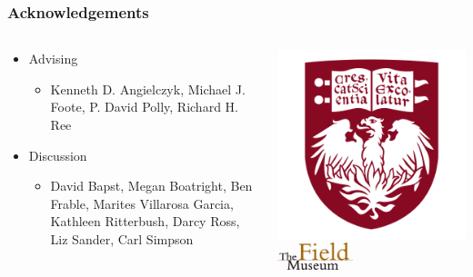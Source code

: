 \documentclass{beamer}
\begin{document}
\begin{frame}
  \frametitle{Acknowledgements}
  \begin{columns}
    \begin{column}{0.4\textwidth}
      \begin{itemize}
        \item Advising
          \begin{itemize}
            \item Kenneth D. Angielczyk, Michael J. Foote, P. David Polly, Richard H. Ree
          \end{itemize}

        \item Discussion 
          \begin{itemize}
            \item David Bapst, Megan Boatright, Ben Frable, Marites Villarosa Garcia, Kathleen Ritterbush, Darcy Ross, Liz Sander, Carl Simpson
          \end{itemize}
      \end{itemize}
    \end{column}
    \begin{column}{0.6\textwidth}
      \includegraphics[height = 0.3\textheight, keepaspectratio = true]{figure/chicago} 
      \includegraphics[width = 0.4\textwidth, keepaspectratio = true]{figure/field}


\end{column}
\end{columns}
\end{frame}
\end{document}
